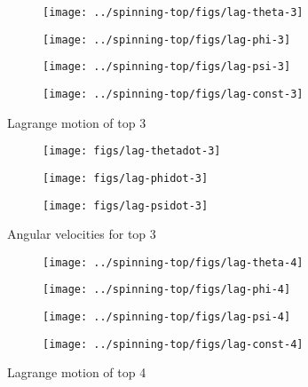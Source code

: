 \begin{figure}[H]
  \centering
  \begin{subfigure}{0.49\textwidth}
    \texttt{[image: ../spinning-top/figs/lag-theta-3]}
    \caption{}
  \end{subfigure}
  \begin{subfigure}{0.49\textwidth}
    \texttt{[image: ../spinning-top/figs/lag-phi-3]}
    \caption{}
  \end{subfigure}
  \begin{subfigure}{0.49\textwidth}
    \texttt{[image: ../spinning-top/figs/lag-psi-3]}
    \caption{}
    \end{subfigure}
  \begin{subfigure}{0.49\textwidth}
    \texttt{[image: ../spinning-top/figs/lag-const-3]}
    \caption{}
    \label{fig:lagE3}
  \end{subfigure}
  \caption{Lagrange motion of top 3}
  \label{fig:motion-Top3}
\end{figure}

\begin{figure}[H]
  \centering
  \begin{subfigure}{0.49\textwidth}
    \texttt{[image: figs/lag-thetadot-3]}
    \caption{}
  \end{subfigure}
  \begin{subfigure}{0.49\textwidth}
    \texttt{[image: figs/lag-phidot-3]}
    \caption{}
  \end{subfigure}
  \begin{subfigure}{0.49\textwidth}
    \texttt{[image: figs/lag-psidot-3]}
    \caption{}
  \end{subfigure}
  \caption{Angular velocities for top 3}
\end{figure}

\begin{figure}[H]
  \centering
  \begin{subfigure}{0.49\textwidth}
    \texttt{[image: ../spinning-top/figs/lag-theta-4]}
    \caption{}
  \end{subfigure}
  \begin{subfigure}{0.49\textwidth}
    \texttt{[image: ../spinning-top/figs/lag-phi-4]}
    \caption{}
  \end{subfigure}
  \begin{subfigure}{0.49\textwidth}
    \texttt{[image: ../spinning-top/figs/lag-psi-4]}
    \caption{}
    \end{subfigure}
  \begin{subfigure}{0.49\textwidth}
    \texttt{[image: ../spinning-top/figs/lag-const-4]}
    \caption{}
    \label{fig:lagE4}
  \end{subfigure}
  \caption{Lagrange motion of top 4}
  \label{fig:motion-Top4}
\end{figure}

